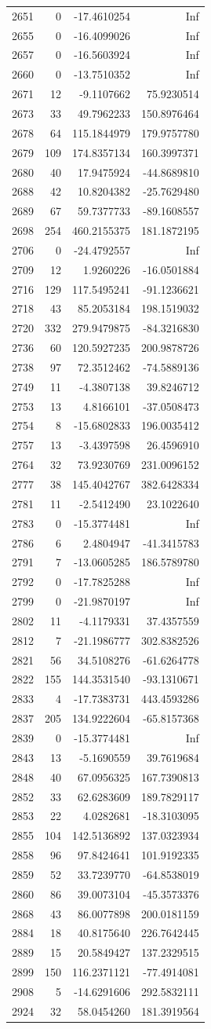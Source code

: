 \documentclass[
]{article}
\begin{document}
\begin{longtable}[]{@{}lrrr@{}}
2651 & 0 & -17.4610254 & Inf\tabularnewline
2655 & 0 & -16.4099026 & Inf\tabularnewline
2657 & 0 & -16.5603924 & Inf\tabularnewline
2660 & 0 & -13.7510352 & Inf\tabularnewline
2671 & 12 & -9.1107662 & 75.9230514\tabularnewline
2673 & 33 & 49.7962233 & 150.8976464\tabularnewline
2678 & 64 & 115.1844979 & 179.9757780\tabularnewline
2679 & 109 & 174.8357134 & 160.3997371\tabularnewline
2680 & 40 & 17.9475924 & -44.8689810\tabularnewline
2688 & 42 & 10.8204382 & -25.7629480\tabularnewline
2689 & 67 & 59.7377733 & -89.1608557\tabularnewline
2698 & 254 & 460.2155375 & 181.1872195\tabularnewline
2706 & 0 & -24.4792557 & Inf\tabularnewline
2709 & 12 & 1.9260226 & -16.0501884\tabularnewline
2716 & 129 & 117.5495241 & -91.1236621\tabularnewline
2718 & 43 & 85.2053184 & 198.1519032\tabularnewline
2720 & 332 & 279.9479875 & -84.3216830\tabularnewline
2736 & 60 & 120.5927235 & 200.9878726\tabularnewline
2738 & 97 & 72.3512462 & -74.5889136\tabularnewline
2749 & 11 & -4.3807138 & 39.8246712\tabularnewline
2753 & 13 & 4.8166101 & -37.0508473\tabularnewline
2754 & 8 & -15.6802833 & 196.0035412\tabularnewline
2757 & 13 & -3.4397598 & 26.4596910\tabularnewline
2764 & 32 & 73.9230769 & 231.0096152\tabularnewline
2777 & 38 & 145.4042767 & 382.6428334\tabularnewline
2781 & 11 & -2.5412490 & 23.1022640\tabularnewline
2783 & 0 & -15.3774481 & Inf\tabularnewline
2786 & 6 & 2.4804947 & -41.3415783\tabularnewline
2791 & 7 & -13.0605285 & 186.5789780\tabularnewline
2792 & 0 & -17.7825288 & Inf\tabularnewline
2799 & 0 & -21.9870197 & Inf\tabularnewline
2802 & 11 & -4.1179331 & 37.4357559\tabularnewline
2812 & 7 & -21.1986777 & 302.8382526\tabularnewline
2821 & 56 & 34.5108276 & -61.6264778\tabularnewline
2822 & 155 & 144.3531540 & -93.1310671\tabularnewline
2833 & 4 & -17.7383731 & 443.4593286\tabularnewline
2837 & 205 & 134.9222604 & -65.8157368\tabularnewline
2839 & 0 & -15.3774481 & Inf\tabularnewline
2843 & 13 & -5.1690559 & 39.7619684\tabularnewline
2848 & 40 & 67.0956325 & 167.7390813\tabularnewline
2852 & 33 & 62.6283609 & 189.7829117\tabularnewline
2853 & 22 & 4.0282681 & -18.3103095\tabularnewline
2855 & 104 & 142.5136892 & 137.0323934\tabularnewline
2858 & 96 & 97.8424641 & 101.9192335\tabularnewline
2859 & 52 & 33.7239770 & -64.8538019\tabularnewline
2860 & 86 & 39.0073104 & -45.3573376\tabularnewline
2868 & 43 & 86.0077898 & 200.0181159\tabularnewline
2884 & 18 & 40.8175640 & 226.7642445\tabularnewline
2889 & 15 & 20.5849427 & 137.2329515\tabularnewline
2899 & 150 & 116.2371121 & -77.4914081\tabularnewline
2908 & 5 & -14.6291606 & 292.5832111\tabularnewline
2924 & 32 & 58.0454260 & 181.3919564\tabularnewline

\end{longtable}
\end{document}
